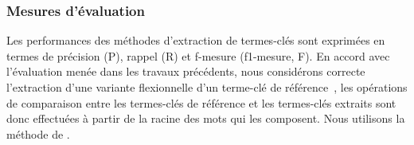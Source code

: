      \subsubsection{Mesures d'évaluation}
      \label{subsubsec:main:domain_independent_keyphrase_extraction-unsupervised_automatic_keyphrase_extraction-evaluation-evaluation_measures}
        Les performances des méthodes d'extraction de termes-clés sont exprimées
        en termes de précision (P), rappel (R) et f-mesure (f1-mesure, F). En
        accord avec l'évaluation menée dans les travaux précédents, nous
        considérons correcte l'extraction d'une variante flexionnelle d'un
        terme-clé de référence~\cite{kim2010semeval}, les opérations de
        comparaison entre les termes-clés de référence et les termes-clés
        extraits sont donc effectuées à partir de la racine des mots qui les
        composent. Nous utilisons la méthode de
        .

